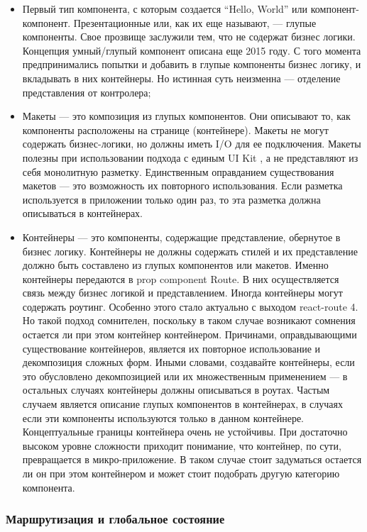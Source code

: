 \begin{itemize}
    \item Первый тип компонента, с которым создается “Hello, World” или компонент-компонент.
    Презентационные или, как их еще называют, — глупые компоненты. Свое прозвище заслужили тем, что не содержат бизнес логики.
    Концепция умный/глупый компонент описана еще 2015 году.
    С того момента предпринимались попытки и добавить в глупые компоненты бизнес логику, и вкладывать в них контейнеры.
    Но истинная суть неизменна — отделение представления от контролера;
    \item Макеты — это композиция из глупых компонентов.
    Они описывают то, как компоненты расположены на странице (контейнере).
    Макеты не могут содержать бизнес-логики, но должны иметь I/O для ее подключения.
    Макеты полезны при использовании подхода с единым UI Kit , а не представляют из себя монолитную разметку.
    Единственным оправданием существования макетов — это возможность их повторного использования.
    Если разметка используется в приложении только один раз, то эта разметка должна описываться в контейнерах.
    \item Контейнеры — это компоненты, содержащие представление, обернутое в бизнес логику.
    Контейнеры не должны содержать стилей и их представление должно быть составлено из глупых компонентов или макетов.
    Именно контейнеры передаются в prop component Route. В них осуществляется связь между бизнес логикой и представлением.
    Иногда контейнеры могут содержать роутинг. Особенно этого стало актуально с выходом react-route 4.
    Но такой подход сомнителен, поскольку в таком случае возникают сомнения остается ли при этом контейнер контейнером.
    Причинами, оправдывающими существование контейнеров, является их повторное использование и декомпозиция сложных форм.
    Иными словами, создавайте контейнеры, если это обусловлено декомпозицией или их множественным применением — в остальных случаях контейнеры должны описываться в роутах.
    Частым случаем является описание глупых компонентов в контейнерах, в случаях если эти компоненты используются только в данном контейнере.
    Концептуальные границы контейнера очень не устойчивы.
    При достаточно высоком уровне сложности приходит понимание, что контейнер, по сути, превращается в микро-приложение.
    В таком случае стоит задуматься остается ли он при этом контейнером и может стоит подобрать другую категорию компонента.
\end{itemize}

\subsubsection{Маршрутизация и глобальное состояние}\hfill

